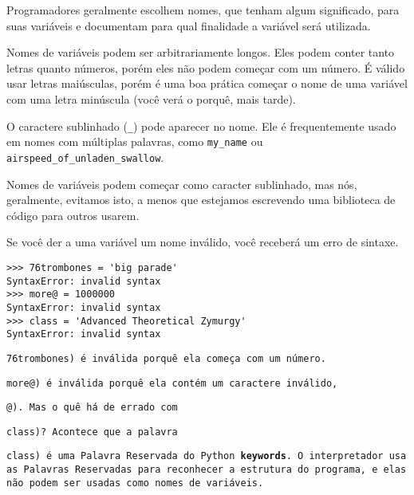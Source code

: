 {{{{

Programadores geralmente escolhem nomes, que tenham algum significado, 
para suas variáveis e documentam para qual finalidade a 
variável será utilizada.

Nomes de variáveis podem ser arbitrariamente longos. Eles podem conter 
tanto letras quanto números, porém eles não podem começar com um número.
É válido usar letras maiúsculas, porém é uma boa prática começar o nome de uma variável 
com uma letra minúscula (você verá o porquê, mais tarde).

O caractere sublinhado (\verb"_") pode aparecer no nome.
Ele é frequentemente usado em nomes com múltiplas palavras, como 
\verb"my_name" ou \verb"airspeed_of_unladen_swallow".

Nomes de variáveis podem começar como caracter sublinhado, mas
nós, geralmente, evitamos isto, a menos que estejamos escrevendo 
uma biblioteca de código para outros usarem.


Se você der a uma variável um nome inválido, você receberá um erro de sintaxe.

\beforeverb
\begin{verbatim}
>>> 76trombones = 'big parade'
SyntaxError: invalid syntax
>>> more@ = 1000000
SyntaxError: invalid syntax
>>> class = 'Advanced Theoretical Zymurgy'
SyntaxError: invalid syntax
\end{verbatim}
\afterverb
%

{\tt 76trombones) é inválida porquê ela começa com um número.
{\tt more@) é inválida porquê ela contém um caractere inválido, {\tt @). 
Mas o quê há de errado com {\tt class)?
Acontece que a palavra {\tt class) é uma Palavra Reservada do Python {\bf keywords}.
O interpretador usa as Palavras Reservadas para reconhecer a estrutura do programa,
e elas não podem ser usadas como nomes de variáveis.


}}}}}}}}}
